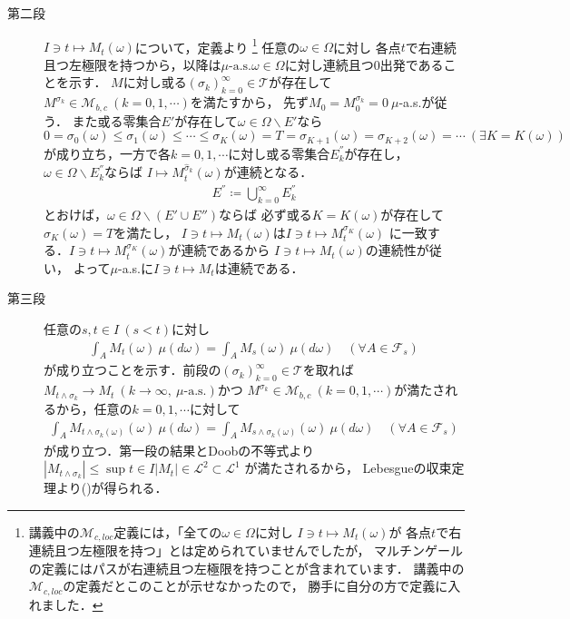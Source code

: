 \begin{prf}
\begin{description}
			\item[第二段] $I \ni t \longmapsto M_t(\omega)$について，定義より
				\footnote{
					講義中の$\mathcal{M}_{c,loc}$定義には，「全ての$\omega \in \Omega$に対し
					$I \ni t \longmapsto M_t(\omega)$が
					各点$t$で右連続且つ左極限を持つ」とは定められていませんでしたが，
					マルチンゲールの定義にはパスが右連続且つ左極限を持つことが含まれています．
					講義中の$\mathcal{M}_{c,loc}$の定義だとこのことが示せなかったので，
					勝手に自分の方で定義に入れました．
				}
				任意の$\omega \in \Omega$に対し
				各点$t$で右連続且つ左極限を持つから，以降は$\mbox{$\mu$-a.s.}\omega \in \Omega$に対し連続且つ0出発であることを示す．
				$M$に対し或る$\left( \sigma_k \right)_{k=0}^{\infty} \in \mathcal{T}$が存在して
				$M^{\sigma_k} \in \mathcal{M}_{b,c}\ (k=0,1,\cdots)$を満たすから，
				先ず$M_0 = M^{\sigma_k}_0 = 0\ \mu$-a.s.が従う．
				また或る零集合$E'$が存在して$\omega \in \Omega \backslash E'$なら
				$0 = \sigma_0(\omega) \leq \sigma_1(\omega) \leq \cdots \leq \sigma_{K}(\omega) = T = \sigma_{K+1}(\omega) = \sigma_{K+2}(\omega) = \cdots\ (\exists K = K(\omega))$
				が成り立ち，一方で各$k =0,1,\cdots$に対し或る零集合$E_k^{''}$が存在し，$\omega \in \Omega \backslash E_k^{''}$ならば
				$I \longmapsto M^{\hat{\sigma}_k}_t(\omega)$が連続となる．
				\begin{align}
					E^{''} \coloneqq \bigcup_{k=0}^{\infty} E_k^{''}
				\end{align}
				とおけば，$\omega \in \Omega \backslash (E' \cup E'')$ならば
				必ず或る$K = K(\omega)$が存在して$\sigma_K(\omega) = T$を満たし，
				$I \ni t \longmapsto M_t(\omega)$は$I \ni t \longmapsto M^{\sigma_K}_t(\omega)$
				に一致する．$I \ni t \longmapsto M^{\sigma_K}_t(\omega)$が連続であるから
				$I \ni t \longmapsto M_t(\omega)$の連続性が従い，
				よって$\mu$-a.s.に$I \ni t \longmapsto M_t$は連続である．
				
			\item[第三段] 任意の$s,t \in I\ (s < t)$に対し
				\begin{align}
					\int_A M_t(\omega)\ \mu(d\omega) = \int_A M_s(\omega)\ \mu(d\omega)
					\quad (\forall A \in \mathcal{F}_s)
					\label{thm:thm_quadratic_variation_bounded_then_M_2c_2}
				\end{align}
				が成り立つことを示す．前段の$\left( \sigma_k \right)_{k=0}^{\infty} \in \mathcal{T}$を取れば
				$M_{t \wedge \sigma_k} \longrightarrow M_t\ (k \longrightarrow \infty,\ \mbox{$\mu$-a.s.})$かつ
				$M^{\sigma_k} \in \mathcal{M}_{b,c}\ (k=0,1,\cdots)$が満たされるから，任意の$k =0,1,\cdots$に対して
				\begin{align}
					\int_A M_{t \wedge \sigma_k(\omega)}(\omega)\ \mu(d\omega) 
					= \int_A M_{s \wedge \sigma_k(\omega)}(\omega)\ \mu(d\omega)
					\quad (\forall A \in \mathcal{F}_s)
				\end{align}
				が成り立つ．第一段の結果とDoobの不等式より
				$\left| M_{t \wedge \sigma_k} \right| \leq \sup{t \in I}{\left| M_t \right|} \in \mathscr{L}^2 \subset \mathscr{L}^1$
				が満たされるから，
				Lebesgueの収束定理より()が得られる．
				\QED
		\end{description}
	\end{prf}